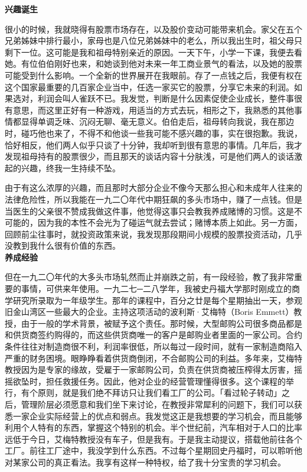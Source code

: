 \documentclass[UTF8,a4paper,zihao=-4,fontset = windows]{ctexart} %
\begin{document}
\textbf{兴趣诞生}


很小的时候，我就晓得有股票市场存在，以及股价变动可能带来机会。家父在五个兄弟姊妹中排行最小，家母也是八位兄弟姊妹中的老么，所以我出生时，祖父母只剩下一位。这可能是我和祖母特别亲近的原因。一天下午，小学一下课，我便去看她。有位伯伯刚好也来，和她谈到他对未来一年工商业景气的看法，以及她的股票可能受到什么影响。一个全新的世界展开在我眼前。存了一点钱之后，我便有权在这个国家最重要的几百家企业当中，任选一家买它的股票，分享它未来的利润。如果选对，利润会叫人雀跃不已。我发觉，判断是什么因素促使企业成长，整件事很有意思，而这里正好有一种游戏，用适当的方式去玩，相形之下，我熟悉的其他事情都显得单调乏味、沉闷无聊、毫无意义。伯伯走后，祖母转向我说，我在那边时，碰巧他也来了，不得不和他谈一些我可能不感兴趣的事，实在很抱歉。我说，恰好相反，他们两人似乎只谈了十分钟，我却听到很有意思的事情。几年后，我才发现祖母持有的股票很少，而且那天的谈话内容十分肤浅，可是他们两人的谈话激起的兴趣，终我一生持续不坠。

由于有这么浓厚的兴趣，而且那时大部分企业不像今天那么担心和未成年人往来的法律危险性，所以我能在一九二〇年代中期狂飙的多头市场中，赚了一点钱。但是当医生的父亲很不赞成我做这件事，他觉得这事只会教我养成赌博的习惯。这是不可能的，因为我的本性不会光为了碰运气就去尝试；赌博本质上如此。另一方面，回顾前尘往事时，就投资政策来说，我发现那段期间小规模的股票投资活动，几乎没教到我什么很有价值的东西。
\\

\textbf{养成经验}


但在一九二〇年代的大多头市场轧然而止并崩跌之前，有一段经验，教了我非常重要的事情，可供来年使用。一九二七─二八学年，我被史丹福大学那时刚成立的商学研究所录取为一年级学生。那年的课程中，百分之廿是每个星期抽出一天，参观旧金山湾区一些最大的企业。主持这项活动的波利斯·艾梅特（Boris Emmett）教授，由于一般的学术背景，被赋予这个责任。那时候，大型邮购公司很多商品都是和供货商签约购得的，而这些供货商唯一的客户是邮购业者里面的一家公司。合约条件往往对制造商很不利，利润率很低，所以每过一段时间，就有一家制造商陷入严重的财务困境。眼睁睁看着供货商倒闭，不合邮购公司的利益。多年来，艾梅特教授因为是专家的缘故，受雇于一家邮购公司，负责在供货商被压榨得太厉害，摇摇欲坠时，担任救援任务。因此，他对企业的经营管理懂得很多。这个课程的举行，有个原则，就是我们绝不拜访只让我们看工厂的公司。「看过轮子转动」之后，管理阶层必须愿意和我们坐下来讨论，在教授非常犀利的问题下，我们可以获悉一家企业实际经营上的优点和弱点。我发觉这正是我想要的学习机会，而且能够利用个人特有的东西，掌握这个特别的机会。半个世纪前，汽车相对于人口的比率远低于今日，艾梅特教授没有车子，但是我有。于是我主动提议，搭载他前往各个工厂。前往工厂途中，我没学到什么东西。不过每个星期回史丹福时，可以聆听他对某家公司的真正看法。我享有这样一种特权，给了我十分宝贵的学习机会。
\end{document}
